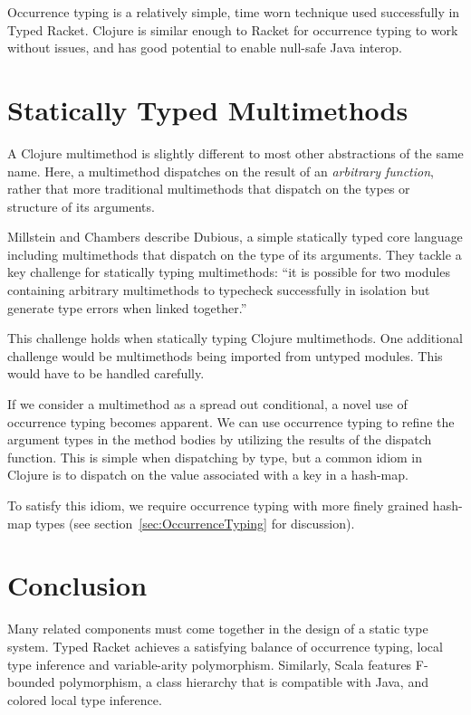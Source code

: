\documentclass[12pt, a4paper]{article}
\begin{document}
Occurrence typing is a relatively simple, time worn technique used successfully 
in Typed Racket. Clojure is similar enough to Racket for occurrence typing to work
without issues, and has good potential to enable null-safe Java interop.

\section{Statically Typed Multimethods}

A Clojure multimethod is slightly different to most other
abstractions of the same name. Here, a multimethod 
dispatches on the result of an \emph{arbitrary function},
rather that more traditional multimethods that dispatch on
the types or structure of its arguments.

Millstein and Chambers \cite{Millstein02modularstatically}
describe Dubious, a simple statically typed core language including multimethods that
dispatch on the type of its arguments. They tackle a key challenge for statically typing
multimethods: ``it is possible for two modules containing arbitrary multimethods to typecheck
successfully in isolation but generate type errors when linked together.'' \cite{Millstein02modularstatically}

This challenge holds when statically typing Clojure multimethods.
One additional challenge would be multimethods being imported from 
untyped modules. This would have to be handled carefully.

If we consider a multimethod as a spread out conditional, a
novel use of occurrence typing becomes apparent. We can use
occurrence typing to refine the argument types in the method bodies
by utilizing the results of the dispatch function. This is simple
when dispatching by type, but a common idiom in Clojure is to dispatch
on the value associated with a key in a hash-map. 

To satisfy this idiom, we require occurrence typing with more
finely grained hash-map types (see section~\ref{sec:OccurrenceTyping} for discussion).

\section{Conclusion}

Many related components must come together in the design of a
static type system. Typed Racket achieves a satisfying balance of 
occurrence typing, local type inference and variable-arity polymorphism.
Similarly, Scala features F-bounded polymorphism, a class hierarchy
that is compatible with Java, and colored local type inference.
\end{document}
